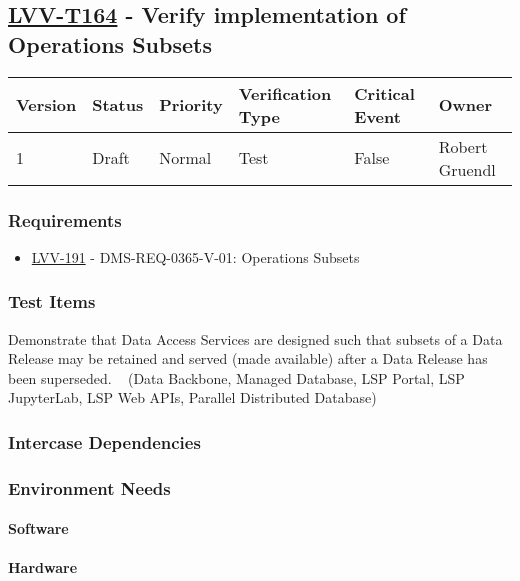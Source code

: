 \subsection{\href{https://jira.lsstcorp.org/secure/Tests.jspa\#/testCase/LVV-T164}{LVV-T164}
    - Verify implementation of Operations Subsets}\label{lvv-t164}

\begin{longtable}[]{llllll}
\toprule
Version & Status & Priority & Verification Type & Critical Event & Owner
\\\midrule
1 & Draft & Normal &
Test & False & Robert Gruendl
\\\bottomrule
\end{longtable}

\subsubsection{Requirements}
\begin{itemize}
\item \href{https://jira.lsstcorp.org/browse/LVV-191}{LVV-191} - DMS-REQ-0365-V-01: Operations Subsets
\end{itemize}

\subsubsection{Test Items}
Demonstrate that Data Access Services are designed such that subsets of
a Data Release may be retained and served (made available) after a Data
Release has been superseded. ~ (Data Backbone, Managed Database, LSP
Portal, LSP JupyterLab, LSP Web APIs, Parallel Distributed Database)



\subsubsection{Intercase Dependencies}

\subsubsection{Environment Needs}

\paragraph{Software}

\paragraph{Hardware}

